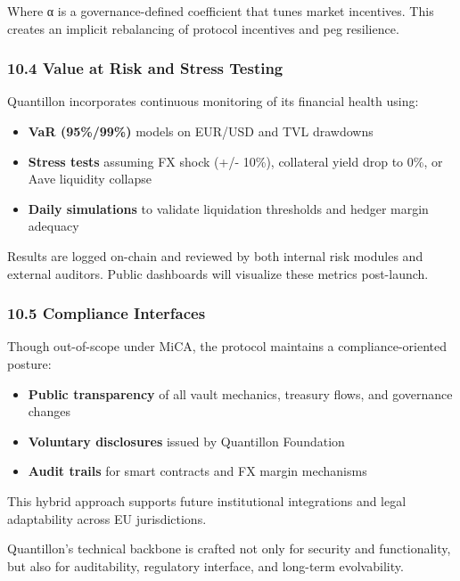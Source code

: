 Where α is a governance-defined coefficient that tunes market
incentives. This creates an implicit rebalancing of protocol incentives
and peg resilience.

\hypertarget{value-at-risk-and-stress-testing}{%
\subsubsection{10.4 Value at Risk and Stress
Testing}\label{value-at-risk-and-stress-testing}}

Quantillon incorporates continuous monitoring of its financial health
using:

\begin{itemize}
\item
  \textbf{VaR (95\%/99\%)} models on EUR/USD and TVL drawdowns
\item
  \textbf{Stress tests} assuming FX shock (+/- 10\%), collateral yield
  drop to 0\%, or Aave liquidity collapse
\item
  \textbf{Daily simulations} to validate liquidation thresholds and
  hedger margin adequacy
\end{itemize}

Results are logged on-chain and reviewed by both internal risk modules
and external auditors. Public dashboards will visualize these metrics
post-launch.

\hypertarget{compliance-interfaces}{%
\subsubsection{10.5 Compliance Interfaces}\label{compliance-interfaces}}

Though out-of-scope under MiCA, the protocol maintains a
compliance-oriented posture:

\begin{itemize}
\item
  \textbf{Public transparency} of all vault mechanics, treasury flows,
  and governance changes
\item
  \textbf{Voluntary disclosures} issued by Quantillon Foundation
\item
  \textbf{Audit trails} for smart contracts and FX margin mechanisms
\end{itemize}

This hybrid approach supports future institutional integrations and
legal adaptability across EU jurisdictions.

Quantillon's technical backbone is crafted not only for security and
functionality, but also for auditability, regulatory interface, and
long-term evolvability.
